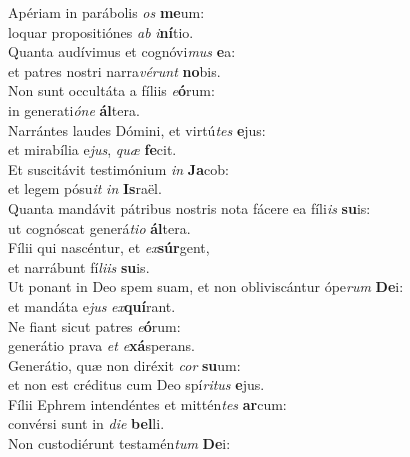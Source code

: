 \evenverse Apériam in parábolis \textit{os} \textbf{me}um:~\*\\
\evenverse loquar propositiónes \textit{ab} \textit{i}\textbf{ní}tio.\\
\oddverse Quanta audívimus et cognóvi\textit{mus} \textbf{e}a:~\*\\
\oddverse et patres nostri narra\textit{vé}\textit{runt} \textbf{no}bis.\\
\evenverse Non sunt occultáta a fíliis \textit{e}\textbf{ó}rum:~\*\\
\evenverse in generati\textit{ó}\textit{ne} \textbf{ál}tera.\\
\oddverse Narrántes laudes Dómini, et virtú\textit{tes} \textbf{e}jus:~\*\\
\oddverse et mirabília e\textit{jus}, \textit{quæ} \textbf{fe}cit.\\
\evenverse Et suscitávit testimónium \textit{in} \textbf{Ja}cob:~\*\\
\evenverse et legem pósu\textit{it} \textit{in} \textbf{Is}raël.\\
\oddverse Quanta mandávit pátribus nostris nota fácere ea fíli\textit{is} \textbf{su}is:~\*\\
\oddverse ut cognóscat generá\textit{ti}\textit{o} \textbf{ál}tera.\\
\evenverse Fílii qui nascéntur, et \textit{ex}\textbf{súr}gent,~\*\\
\evenverse et narrábunt fí\textit{li}\textit{is} \textbf{su}is.\\
\oddverse Ut ponant in Deo spem suam, et non obliviscántur ópe\textit{rum} \textbf{De}i:~\*\\
\oddverse et mandáta e\textit{jus} \textit{ex}\textbf{quí}rant.\\
\evenverse Ne fiant sicut patres \textit{e}\textbf{ó}rum:~\*\\
\evenverse generátio prava \textit{et} \textit{e}\textbf{xá}sperans.\\
\oddverse Generátio, quæ non diréxit \textit{cor} \textbf{su}um:~\*\\
\oddverse et non est créditus cum Deo spí\textit{ri}\textit{tus} \textbf{e}jus.\\
\evenverse Fílii Ephrem intendéntes et mittén\textit{tes} \textbf{ar}cum:~\*\\
\evenverse convérsi sunt in \textit{di}\textit{e} \textbf{bel}li.\\
\oddverse Non custodiérunt testamén\textit{tum} \textbf{De}i:~\*\\
